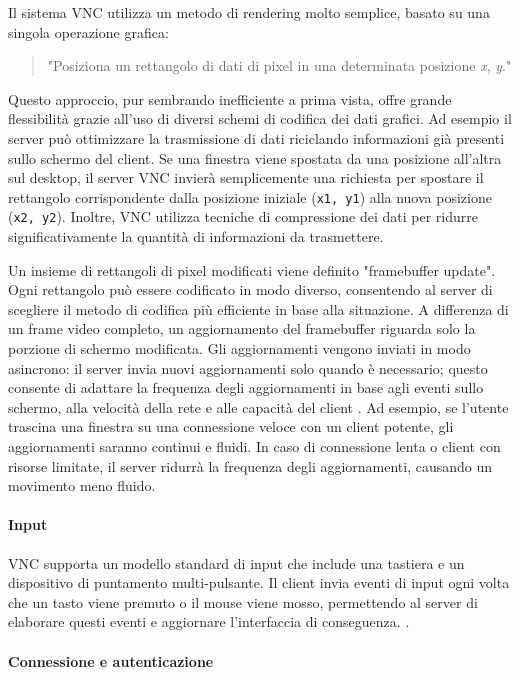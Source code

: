 \documentclass[12pt,a4paper,openright,twoside]{book}
\begin{document}
Il sistema \ac{VNC} utilizza un metodo di rendering molto semplice, basato su una singola operazione grafica:
\begin{quote}
    "Posiziona un rettangolo di dati di pixel in una determinata posizione \emph{x}, \emph{y}."
\end{quote}
Questo approccio, pur sembrando inefficiente a prima vista, offre grande flessibilità grazie all'uso di diversi schemi di codifica dei dati grafici.
%
Ad esempio il server può ottimizzare la trasmissione di dati riciclando informazioni già presenti sullo schermo del client.
%
Se una finestra viene spostata da una posizione all'altra sul desktop,
il server \ac{VNC} invierà semplicemente una richiesta per spostare il rettangolo corrispondente dalla posizione iniziale (\texttt{x1, y1}) alla nuova posizione (\texttt{x2, y2}).
%
Inoltre, \ac{VNC} utilizza tecniche di compressione dei dati per ridurre significativamente la quantità di informazioni da trasmettere.

Un insieme di rettangoli di pixel modificati viene definito "framebuffer update".
Ogni rettangolo può essere codificato in modo diverso,
consentendo al server di scegliere il metodo di codifica più efficiente in base alla situazione.
%
A differenza di un frame video completo,
un aggiornamento del framebuffer riguarda solo la porzione di schermo modificata.
%
Gli aggiornamenti vengono inviati in modo asincrono: il server invia nuovi aggiornamenti solo quando è necessario;
questo consente di adattare la frequenza degli aggiornamenti in base agli eventi sullo schermo, alla velocità della rete e alle capacità del client \cite{richardson1998vnc}.
%
Ad esempio, se l'utente trascina una finestra su una connessione veloce con un client potente,
gli aggiornamenti saranno continui e fluidi. In caso di connessione lenta o client con risorse limitate,
il server ridurrà la frequenza degli aggiornamenti, causando un movimento meno fluido.

\paragraph{Input}

\ac{VNC} supporta un modello standard di input che include una tastiera e un dispositivo di puntamento multi-pulsante.
Il client invia eventi di input ogni volta che un tasto viene premuto o il mouse viene mosso, permettendo al server di elaborare questi eventi e aggiornare l'interfaccia di conseguenza. \cite{richardson1998vnc}.

\paragraph{Connessione e autenticazione}
\end{document}
